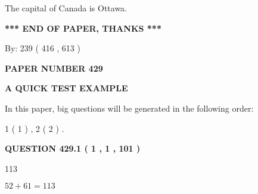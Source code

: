 \documentclass[12pt]{article}
\begin{document}
 
The capital of Canada is Ottawa.
 
 
 
 
   
   
 \vspace{0.2in}
 
   
   
   
   
\vspace{1.0in} 
{\textbf{\large{ *** END OF PAPER, THANKS *** }}} 
   
   
\hspace{1.0in} By: 
 239 ( 416 ,  613 )
   
   
   
   
\newpage 
\setcounter{page}{ 
   429001 } 
   
   
   
   
 {\textbf{ \Large{ PAPER NUMBER  429  }}}
   
   
\vspace{0.2in}
   
   
   
   
   
   
 \vspace{0.2in}
{\LARGE {\textbf{ A QUICK TEST EXAMPLE}}}
   
   
   
\vspace{0.2in}
   
In this paper, big questions will be generated in the following order: 
   
   
   1 ( 1 )
 ,
   2 ( 2 )
 .
  
\vspace{0.2in}
  
{\textbf{\Large{QUESTION
429.1 
 ( 1 , 1 , 101 )
}}}
  
  
 
 
\noindent{}

113
 
 
 
 
\noindent{}

$ %
52 +  %
61=   %
113$
 
 
  
\vspace{0.2in}
  
\end{document}

